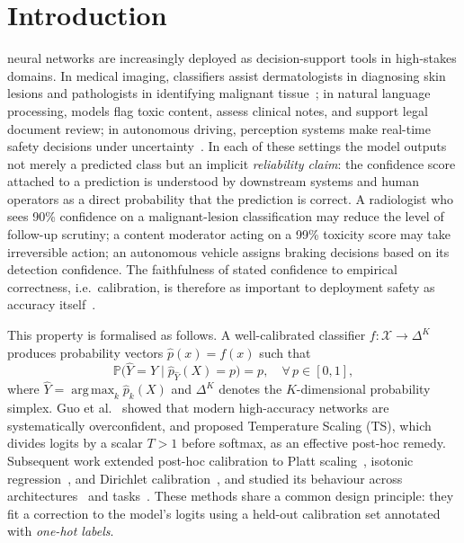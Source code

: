 \documentclass[10pt,journal,compsoc]{IEEEtran}
\newcommand{\X}{\mathcal{X}}
\newcommand{\phat}{\hat{p}}
\newcommand{\bP}{\mathbb{P}}
\DeclareMathOperator*{\argmax}{arg\,max}
\begin{document}
\section{Introduction}
\label{sec:intro}

 neural networks are increasingly deployed as decision-support tools in high-stakes domains.  In medical imaging, classifiers assist dermatologists in diagnosing skin lesions and pathologists in identifying malignant tissue~\cite{haenssle2018man,kompa2021second}; in natural language processing, models flag toxic content, assess clinical notes, and support legal document review; in autonomous driving, perception systems make real-time safety decisions under uncertainty~\cite{feng2022review}.  In each of these settings the model outputs not merely a predicted class but an implicit \emph{reliability claim}: the confidence score attached to a prediction is understood by downstream systems and human operators as a direct probability that the prediction is correct.  A radiologist who sees 90\% confidence on a malignant-lesion classification may reduce the level of follow-up scrutiny; a content moderator acting on a 99\% toxicity score may take irreversible action; an autonomous vehicle assigns braking decisions based on its detection confidence.  The faithfulness of stated confidence to empirical correctness, i.e.\ calibration, is therefore as important to deployment safety as accuracy itself~\cite{ovadia2019trust,abdar2021review}.

This property is formalised as follows.  A well-calibrated classifier $f:\X\to\Delta^{K}$ produces probability vectors $\phat(x)=f(x)$ such that
\begin{equation}
  \bP\!\bigl(\hat{Y}=Y \mid \phat_{\hat{Y}}(X)=p\bigr) = p, \quad \forall\, p\in[0,1],
  \label{eq:hard-cal}
\end{equation}
where $\hat{Y}=\argmax_k\phat_k(X)$ and $\Delta^K$ denotes the $K$-dimensional probability simplex.  Guo et al.~\cite{guo2017calibration} showed that modern high-accuracy networks are systematically overconfident, and proposed Temperature Scaling (TS), which divides logits by a scalar $T>1$ before softmax, as an effective post-hoc remedy.  Subsequent work extended post-hoc calibration to Platt scaling~\cite{platt1999probabilistic}, isotonic regression~\cite{zadrozny2002transforming}, and Dirichlet calibration~\cite{kull2019beyond}, and studied its behaviour across architectures~\cite{minderer2021revisiting} and tasks~\cite{bai2021don}.  These methods share a common design principle: they fit a correction to the model's logits using a held-out calibration set annotated with \emph{one-hot labels}.
\end{document}
